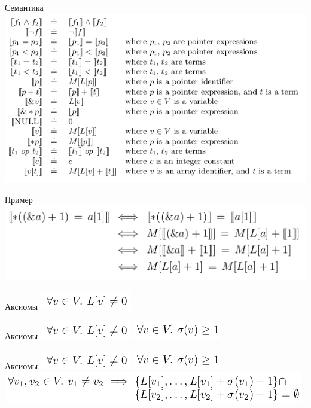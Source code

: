 \documentclass{beamer}
\begin{document}
\begin{frame}{Семантика}
\includegraphics[scale=0.5]{semantics.png}
\end{frame}

\begin{frame}{Пример}
\includegraphics[scale=0.5]{semantics_ex.png}
\end{frame}

\begin{frame}{Аксиомы}
\includegraphics[scale=0.5]{axiom1.png}\newline
\end{frame}

\begin{frame}{Аксиомы}
\includegraphics[scale=0.5]{axiom1.png}\newline
\includegraphics[scale=0.5]{axiom2.png}\newline
\end{frame}

\begin{frame}{Аксиомы}
\includegraphics[scale=0.5]{axiom1.png}\newline
\includegraphics[scale=0.5]{axiom2.png}\newline
\includegraphics[scale=0.5]{axiom3.png}
\end{frame}
\end{document}
